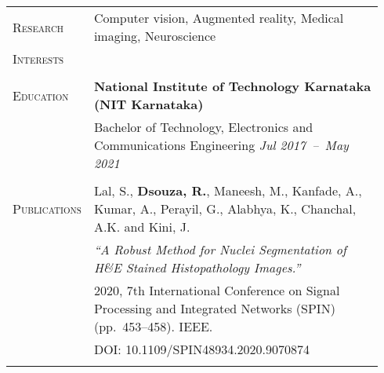\documentclass[letterpaper, 10pt, oneside]{article}
\newcommand{\stitle}[1]{\normalsize{\textsc{#1}}}
\begin{document}
\noindent \begin{longtable}{@{} p{0.14\linewidth} p{0.8\linewidth}}
\stitle{Research}  & Computer vision, Augmented reality, Medical imaging, Neuroscience \\
\stitle{Interests} & \\
\\


\stitle{Education} & \textbf{National Institute of Technology Karnataka (NIT Karnataka)} \\
                   & Bachelor of Technology, Electronics and Communications Engineering \hfill \hspace{-3em} \textit{Jul 2017\ --\ May 2021}\\
\\


\stitle{Publications} & Lal, S., \textbf{Dsouza, R.}, Maneesh, M., Kanfade, A., Kumar, A., Perayil, G., Alabhya, K., Chanchal, A.K. and Kini, J. \\
                      & \textit{``A Robust Method for Nuclei Segmentation of H\&E Stained Histopathology Images.''} \\
                      & 2020, 7th International Conference on Signal Processing and Integrated Networks (SPIN) (pp.~453--458)\@. IEEE\@.  \\
                      & \textcolor{dark-purple}{DOI\@: 10.1109/SPIN48934.2020.9070874} \\
\\



\end{longtable}
\end{document}
